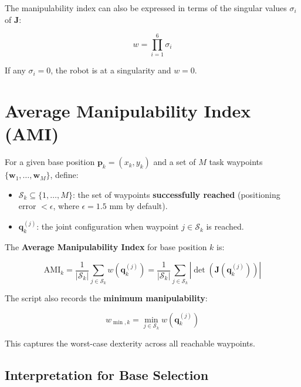 \documentclass[a4paper,11pt]{article}
\begin{document}
The manipulability index can also be expressed in terms of the singular values $\sigma_i$ of $\mathbf{J}$:

\begin{equation}
    w = \prod_{i=1}^{6} \sigma_i
\end{equation}

If any $\sigma_i = 0$, the robot is at a singularity and $w = 0$.

\section{Average Manipulability Index (AMI)}
\label{sec:ami}

For a given base position $\mathbf{p}_k = (x_k, y_k)$ and a set of $M$ task waypoints $\{\mathbf{w}_1, \ldots, \mathbf{w}_M\}$, define:

\begin{itemize}
    \item $\mathcal{S}_k \subseteq \{1, \ldots, M\}$: the set of waypoints \textbf{successfully reached} (positioning error $< \epsilon$, where $\epsilon = 1.5$ mm by default).
    \item $\mathbf{q}_k^{(j)}$: the joint configuration when waypoint $j \in \mathcal{S}_k$ is reached.
\end{itemize}

The \textbf{Average Manipulability Index} for base position $k$ is:

\begin{equation}
    \boxed{\text{AMI}_k = \frac{1}{|\mathcal{S}_k|} \sum_{j \in \mathcal{S}_k} w\!\left(\mathbf{q}_k^{(j)}\right) = \frac{1}{|\mathcal{S}_k|} \sum_{j \in \mathcal{S}_k} \left|\det\!\left(\mathbf{J}\!\left(\mathbf{q}_k^{(j)}\right)\right)\right|}
    \label{eq:ami}
\end{equation}

The script also records the \textbf{minimum manipulability}:

\begin{equation}
    w_{\min,k} = \min_{j \in \mathcal{S}_k} w\!\left(\mathbf{q}_k^{(j)}\right)
    \label{eq:wmin}
\end{equation}

This captures the worst-case dexterity across all reachable waypoints.

\subsection{Interpretation for Base Selection}
\end{document}
